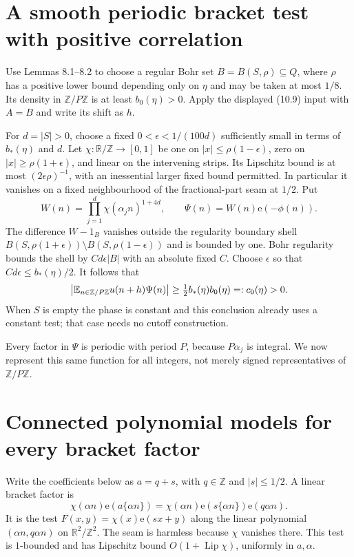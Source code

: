 \documentclass[11pt]{article}
\newcommand{\R}{\mathbb R}\newcommand{\Z}{\mathbb Z}
\newcommand{\ee}{\mathrm e}
\begin{document}
\section{A smooth periodic bracket test with positive correlation}

Use Lemmas 8.1--8.2 to choose a regular Bohr set
$B=B(S,\rho)\subseteq Q$, where $\rho$ has a positive lower bound
depending only on $\eta$ and may be taken at most $1/8$.
Its density in $\Z/P\Z$ is at least $b_0(\eta)>0$.
Apply the displayed (10.9) input with $A=B$ and write its shift as $h$.

For $d=|S|>0$, choose a fixed $0<\epsilon<1/(100d)$ sufficiently
small in terms of $b_*(\eta)$ and $d$. Let $\chi:\R/\Z\to[0,1]$
be one on $|x|\leq\rho(1-\epsilon)$, zero on
$|x|\geq\rho(1+\epsilon)$, and linear on the intervening strips.
Its Lipschitz bound is at most $(2\epsilon\rho)^{-1}$, with an
inessential larger fixed bound permitted. In particular it vanishes
on a fixed neighbourhood of the fractional-part seam at $1/2$.
Put
\[
 W(n)=\prod_{j=1}^d\chi(\alpha_j n)^{1+4d},\qquad
 \Psi(n)=W(n)\ee(-\phi(n)).
\]
The difference $W-1_B$ vanishes outside the regularity boundary shell
$B(S,\rho(1+\epsilon))\setminus B(S,\rho(1-\epsilon))$ and
is bounded by one. Bohr regularity bounds the shell by
$C d\epsilon |B|$ with an absolute fixed $C$. Choose $\epsilon$
so that $Cd\epsilon\leq b_*(\eta)/2$. It follows that
\begin{equation}\label{eq:bias}
 \left|\E_{n\in\Z/P\Z}u(n+h)\Psi(n)\right|
 \geq \tfrac12 b_*(\eta)b_0(\eta)=:c_0(\eta)>0.
\end{equation}
When $S$ is empty the phase is constant and this conclusion already
uses a constant test; that case needs no cutoff construction.

Every factor in $\Psi$ is periodic with period $P$, because
$P\alpha_j$ is integral. We now represent this same function for
all integers, not merely signed representatives of $\Z/P\Z$.

\section{Connected polynomial models for every bracket factor}

Write the coefficients below as $a=q+s$, with $q\in\Z$ and
$|s|\leq1/2$. A linear bracket factor is
\[
 \chi(\alpha n)\ee(a\{\alpha n\})
 =\chi(\alpha n)\ee(s\{\alpha n\})\ee(q\alpha n).
\]
It is the test $F(x,y)=\chi(x)\ee(sx+y)$ along the linear
polynomial $(\alpha n,q\alpha n)$ on $\R^2/\Z^2$.
The seam is harmless because $\chi$ vanishes there. This test is
$1$-bounded and has Lipschitz bound $O(1+\operatorname{Lip}\chi)$,
uniformly in $a,\alpha$.
\end{document}
